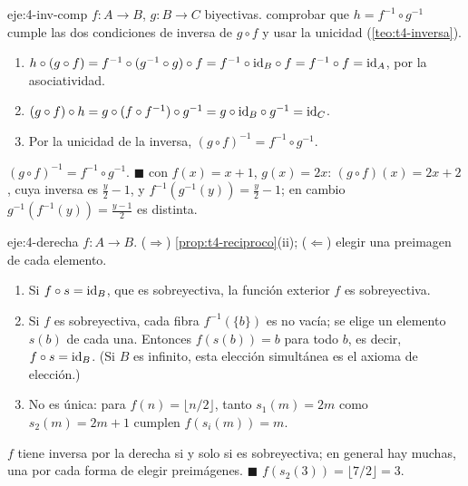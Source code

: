 \begin{solucion}{eje:4-inv-comp}
\datos $f\colon A\to B$, $g\colon B\to C$ biyectivas.
\planteamiento comprobar que $h=f^{-1}\circ g^{-1}$ cumple las dos condiciones de inversa de $g\circ f$ y usar la unicidad (\cref{teo:t4-inversa}).
\pasos
\begin{enumerate}[label=\arabic*.]
  \item $h\circ(g\circ f)=f^{-1}\circ(g^{-1}\circ g)\circ f=f^{-1}\circ\mathrm{id}_B\circ f=f^{-1}\circ f=\mathrm{id}_A$, por la asociatividad.
  \item $(g\circ f)\circ h=g\circ(f\circ f^{-1})\circ g^{-1}=g\circ\mathrm{id}_B\circ g^{-1}=\mathrm{id}_C$.
  \item Por la unicidad de la inversa, $(g\circ f)^{-1}=f^{-1}\circ g^{-1}$.
\end{enumerate}
\resultado $(g\circ f)^{-1}=f^{-1}\circ g^{-1}$. \hfill$\blacksquare$
\comprobacion con $f(x)=x+1$, $g(x)=2x$: $(g\circ f)(x)=2x+2$, cuya inversa es $\tfrac y2-1$, y $f^{-1}(g^{-1}(y))=\tfrac y2-1$; en cambio $g^{-1}(f^{-1}(y))=\tfrac{y-1}{2}$ es distinta.
\end{solucion}

\begin{solucion}{eje:4-derecha}
\datos $f\colon A\to B$.
\planteamiento ($\Rightarrow$) \cref{prop:t4-reciproco}(ii); ($\Leftarrow$) elegir una preimagen de cada elemento.
\pasos
\begin{enumerate}[label=\arabic*.]
  \item Si $f\circ s=\mathrm{id}_B$, que es sobreyectiva, la función exterior $f$ es sobreyectiva.
  \item Si $f$ es sobreyectiva, cada fibra $f^{-1}(\{b\})$ es no vacía; se elige un elemento $s(b)$ de cada una. Entonces $f(s(b))=b$ para todo $b$, es decir, $f\circ s=\mathrm{id}_B$. (Si $B$ es infinito, esta elección simultánea es el axioma de elección.)
  \item No es única: para $f(n)=\lfloor n/2\rfloor$, tanto $s_1(m)=2m$ como $s_2(m)=2m+1$ cumplen $f(s_i(m))=m$.
\end{enumerate}
\resultado $f$ tiene inversa por la derecha si y solo si es sobreyectiva; en general hay muchas, una por cada forma de elegir preimágenes. \hfill$\blacksquare$
\comprobacion $f(s_2(3))=\lfloor7/2\rfloor=3$.
\end{solucion}

